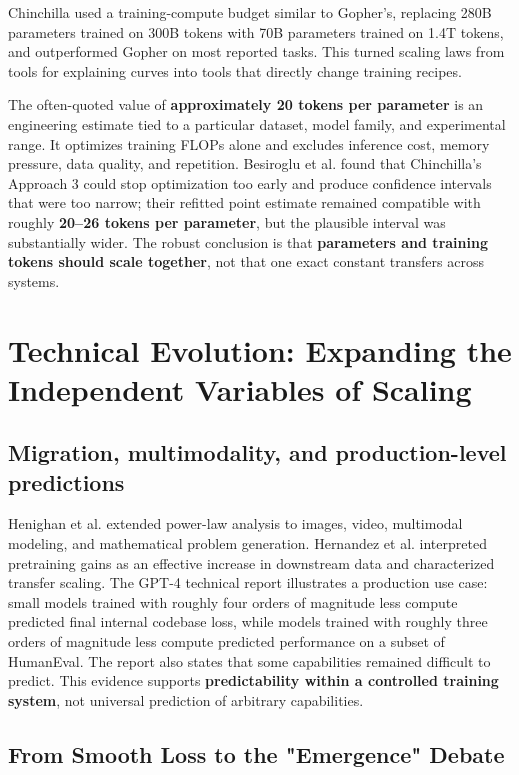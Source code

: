 \documentclass[UTF8,10pt,a4paper,fontset=none]{ctexart}
\newcommand{\term}[1]{\textbf{#1}}
\begin{document}
Chinchilla used a training-compute budget similar to Gopher's, replacing 280B parameters trained on 300B tokens with 70B parameters trained on 1.4T tokens, and outperformed Gopher on most reported tasks\cite{rae2021,hoffmann2022}. This turned scaling laws from tools for explaining curves into tools that directly change training recipes.

The often-quoted value of \textbf{approximately 20 tokens per parameter} is an engineering estimate tied to a particular dataset, model family, and experimental range. It optimizes training FLOPs alone and excludes inference cost, memory pressure, data quality, and repetition. Besiroglu et al. found that Chinchilla's Approach 3 could stop optimization too early and produce confidence intervals that were too narrow; their refitted point estimate remained compatible with roughly \textbf{20--26 tokens per parameter}, but the plausible interval was substantially wider\cite{besiroglu2024}. The robust conclusion is that \term{parameters and training tokens should scale together}, not that one exact constant transfers across systems.

\section{Technical Evolution: Expanding the Independent Variables of Scaling}

\subsection{Migration, multimodality, and production-level predictions}

Henighan et al. extended power-law analysis to images, video, multimodal modeling, and mathematical problem generation\cite{henighan2020}. Hernandez et al. interpreted pretraining gains as an effective increase in downstream data and characterized transfer scaling\cite{hernandez2021}. The GPT-4 technical report illustrates a production use case: small models trained with roughly four orders of magnitude less compute predicted final internal codebase loss, while models trained with roughly three orders of magnitude less compute predicted performance on a subset of HumanEval. The report also states that some capabilities remained difficult to predict\cite{openai2023gpt4}. This evidence supports \term{predictability within a controlled training system}, not universal prediction of arbitrary capabilities.

\subsection{From Smooth Loss to the "Emergence" Debate}
\end{document}
